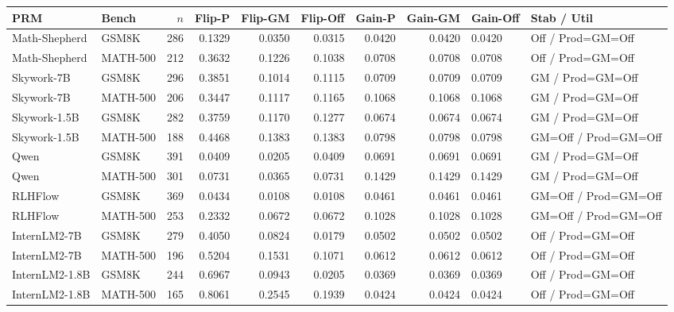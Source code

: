 \begin{tabular}{llrrrrrrll}
\toprule
PRM & Bench & $n$ & Flip-P & Flip-GM & Flip-Off & Gain-P & Gain-GM & Gain-Off & Stab / Util \\
\midrule
Math-Shepherd & GSM8K & 286 & 0.1329 & 0.0350 & 0.0315 & 0.0420 & 0.0420 & 0.0420 & Off / Prod=GM=Off \\
Math-Shepherd & MATH-500 & 212 & 0.3632 & 0.1226 & 0.1038 & 0.0708 & 0.0708 & 0.0708 & Off / Prod=GM=Off \\
Skywork-7B & GSM8K & 296 & 0.3851 & 0.1014 & 0.1115 & 0.0709 & 0.0709 & 0.0709 & GM / Prod=GM=Off \\
Skywork-7B & MATH-500 & 206 & 0.3447 & 0.1117 & 0.1165 & 0.1068 & 0.1068 & 0.1068 & GM / Prod=GM=Off \\
Skywork-1.5B & GSM8K & 282 & 0.3759 & 0.1170 & 0.1277 & 0.0674 & 0.0674 & 0.0674 & GM / Prod=GM=Off \\
Skywork-1.5B & MATH-500 & 188 & 0.4468 & 0.1383 & 0.1383 & 0.0798 & 0.0798 & 0.0798 & GM=Off / Prod=GM=Off \\
Qwen & GSM8K & 391 & 0.0409 & 0.0205 & 0.0409 & 0.0691 & 0.0691 & 0.0691 & GM / Prod=GM=Off \\
Qwen & MATH-500 & 301 & 0.0731 & 0.0365 & 0.0731 & 0.1429 & 0.1429 & 0.1429 & GM / Prod=GM=Off \\
RLHFlow & GSM8K & 369 & 0.0434 & 0.0108 & 0.0108 & 0.0461 & 0.0461 & 0.0461 & GM=Off / Prod=GM=Off \\
RLHFlow & MATH-500 & 253 & 0.2332 & 0.0672 & 0.0672 & 0.1028 & 0.1028 & 0.1028 & GM=Off / Prod=GM=Off \\
InternLM2-7B & GSM8K & 279 & 0.4050 & 0.0824 & 0.0179 & 0.0502 & 0.0502 & 0.0502 & Off / Prod=GM=Off \\
InternLM2-7B & MATH-500 & 196 & 0.5204 & 0.1531 & 0.1071 & 0.0612 & 0.0612 & 0.0612 & Off / Prod=GM=Off \\
InternLM2-1.8B & GSM8K & 244 & 0.6967 & 0.0943 & 0.0205 & 0.0369 & 0.0369 & 0.0369 & Off / Prod=GM=Off \\
InternLM2-1.8B & MATH-500 & 165 & 0.8061 & 0.2545 & 0.1939 & 0.0424 & 0.0424 & 0.0424 & Off / Prod=GM=Off \\
\bottomrule
\end{tabular}
